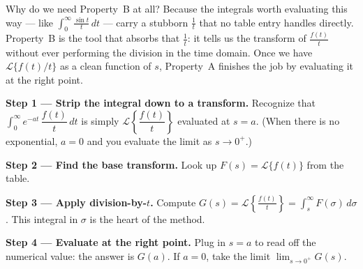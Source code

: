 \documentclass[11pt]{article}
\begin{document}
\noindent Why do we need Property~B at all? Because the integrals worth evaluating this way --- like $\int_0^\infty \frac{\sin t}{t}\,dt$ --- carry a stubborn $\frac{1}{t}$ that no table entry handles directly. Property~B is the tool that absorbs that $\frac{1}{t}$: it tells us the transform of $\frac{f(t)}{t}$ without ever performing the division in the time domain. Once we have $\mathcal{L}\{f(t)/t\}$ as a clean function of $s$, Property~A finishes the job by evaluating it at the right point.

\begin{methodbox}
\textbf{Step 1 --- Strip the integral down to a transform.} Recognize that $\int_0^\infty e^{-at}\,\dfrac{f(t)}{t}\,dt$ is simply $\mathcal{L}\!\left\{\dfrac{f(t)}{t}\right\}$ evaluated at $s=a$. (When there is no exponential, $a=0$ and you evaluate the limit as $s\to0^+$.)

\smallskip
\textbf{Step 2 --- Find the base transform.} Look up $F(s) = \mathcal{L}\{f(t)\}$ from the table.

\smallskip
\textbf{Step 3 --- Apply division-by-$t$.} Compute $\displaystyle G(s) = \mathcal{L}\!\left\{\frac{f(t)}{t}\right\} = \int_s^\infty F(\sigma)\,d\sigma$. This integral in $\sigma$ is the heart of the method.

\smallskip
\textbf{Step 4 --- Evaluate at the right point.} Plug in $s=a$ to read off the numerical value: the answer is $G(a)$. If $a=0$, take the limit $\displaystyle\lim_{s\to0^+}G(s)$.
\end{methodbox}
\end{document}
